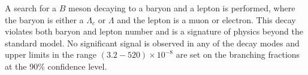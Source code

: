 A search for a $B$ meson decaying to a baryon
and a lepton is performed, where the baryon is
either a $\Lambda_c$ or $\Lambda$ and the lepton is
a muon or electron. This decay violates both baryon and lepton number
and is a signature of physics beyond the standard model.
No significant signal is observed in any of the decay modes
and upper limits in the range $(3.2-520) \times 10^{-8}$
are set on the branching fractions at the 90\% confidence level.

